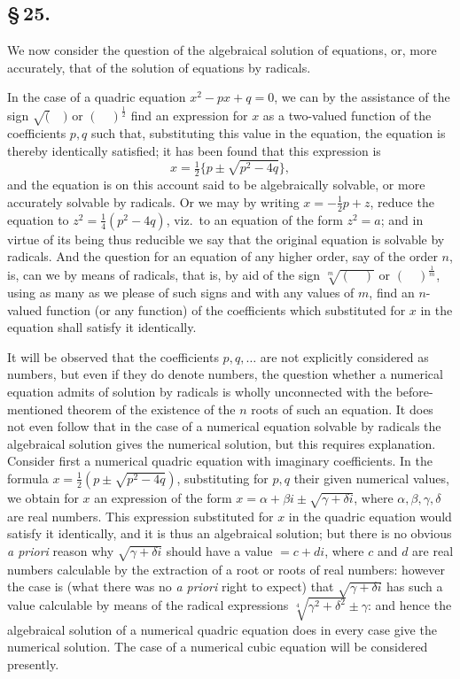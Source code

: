 \documentclass[11pt,a4paper]{book}
\begin{document}
\subsection*{\S\,25.}

We now consider the question of the algebraical solution of equations, or, more accurately, that of the solution of equations by radicals.

In the case of a quadric equation $x^{2} - px + q = 0$, we can by the assistance of the sign $\surd(\quad)$ or $(\quad)^{\frac{1}{2}}$ find an expression for $x$ as a two-valued function of the coefficients $p, q$ such that, substituting this value in the equation, the equation is thereby identically satisfied; it has been found that this expression is
\[
x = \tfrac{1}{2}\{p \pm \sqrt{p^{2} - 4q}\},
\]
and the equation is on this account said to be algebraically solvable, or more accurately solvable by radicals. Or we may by writing $x = -\frac{1}{2}p + z$, reduce the equation to $z^{2} = \frac{1}{4}(p^{2} - 4q)$, viz.\ to an equation of the form $z^{2} = a$; and in virtue of its being thus reducible we say that the original equation is solvable by radicals. And the question for an equation of any higher order, say of the order $n$, is, can we by means of radicals, that is, by aid of the sign $\sqrt[m]{(\quad)}$ or $(\quad)^{\frac{1}{m}}$, using as many as we please of such signs and with any values of $m$, find an $n$-valued function (or any function) of the coefficients which substituted for $x$ in the equation shall satisfy it identically.

It will be observed that the coefficients $p, q, \ldots$ are not explicitly considered as numbers, but even if they do denote numbers, the question whether a numerical equation admits of solution by radicals is wholly unconnected with the before-mentioned theorem of the existence of the $n$ roots of such an equation. It does not even follow that in the case of a numerical equation solvable by radicals the algebraical solution gives the numerical solution, but this requires explanation. Consider first a numerical quadric equation with imaginary coefficients. In the formula $x = \frac{1}{2}(p \pm \sqrt{p^{2} - 4q})$, substituting for $p, q$ their given numerical values, we obtain for $x$ an expression of the form $x = \alpha + \beta i \pm \sqrt{\gamma + \delta i}$, where $\alpha, \beta, \gamma, \delta$ are real numbers. This expression substituted for $x$ in the quadric equation would satisfy it identically, and it is thus an algebraical solution; but there is no obvious \textit{a priori} reason why $\sqrt{\gamma + \delta i}$ should have a value $= c + di$, where $c$ and $d$ are real numbers calculable by the extraction of a root or roots of real numbers: however the case is (what there was no \textit{a priori} right to expect) that $\sqrt{\gamma + \delta i}$ has such a value calculable by means of the radical expressions $\sqrt[4]{\gamma^{2} + \delta^{2}} \pm \gamma$: and hence the algebraical solution of a numerical quadric equation does in every case give the numerical solution. The case of a numerical cubic equation will be considered presently.
\end{document}
